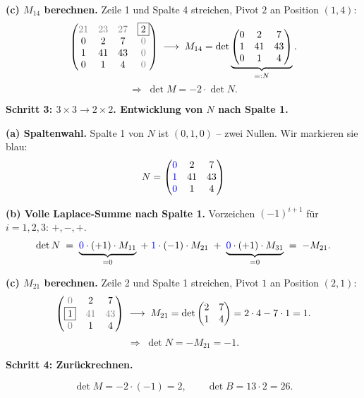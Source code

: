\documentclass[a4paper,12pt]{article}
\begin{document}
\textbf{(c) $M_{14}$ berechnen.} Zeile 1 und Spalte 4 streichen, Pivot $\boxed{2}$ an Position $(1,4)$:
\[
\begin{pmatrix}
\color{gray}{21} & \color{gray}{23} & \color{gray}{27} & \boxed{2} \\
0 & 2 & 7 & \color{gray}{0} \\
1 & 41 & 43 & \color{gray}{0} \\
0 & 1 & 4 & \color{gray}{0}
\end{pmatrix}
\;\longrightarrow\;
M_{14} = \det \underbrace{\begin{pmatrix} 0 & 2 & 7 \\ 1 & 41 & 43 \\ 0 & 1 & 4 \end{pmatrix}}_{=: N}.
\]
\[
\Rightarrow\; \det M = -2 \cdot \det N.
\]

\textbf{Schritt 3: $3\times 3 \to 2\times 2$. Entwicklung von $N$ nach Spalte 1.}

\textbf{(a) Spaltenwahl.} Spalte 1 von $N$ ist $(0, 1, 0)$ -- zwei Nullen. Wir markieren sie blau:
\[
N = \begin{pmatrix}
\color{blue}{0} & 2 & 7 \\
\color{blue}{1} & 41 & 43 \\
\color{blue}{0} & 1 & 4
\end{pmatrix}
\]

\textbf{(b) Volle Laplace-Summe nach Spalte 1.} Vorzeichen $(-1)^{i+1}$ f\"ur $i = 1, 2, 3$: $+, -, +$.
\[
\det N
\;=\; \underbrace{\textcolor{blue}{0} \cdot (+1) \cdot M_{11}}_{= 0}
\;+\; \textcolor{blue}{1} \cdot (-1) \cdot M_{21}
\;+\; \underbrace{\textcolor{blue}{0} \cdot (+1) \cdot M_{31}}_{= 0}
\;=\; -M_{21}.
\]

\textbf{(c) $M_{21}$ berechnen.} Zeile 2 und Spalte 1 streichen, Pivot $\boxed{1}$ an Position $(2,1)$:
\[
\begin{pmatrix}
\color{gray}{0} & 2 & 7 \\
\boxed{1} & \color{gray}{41} & \color{gray}{43} \\
\color{gray}{0} & 1 & 4
\end{pmatrix}
\;\longrightarrow\;
M_{21} = \det \begin{pmatrix} 2 & 7 \\ 1 & 4 \end{pmatrix} = 2 \cdot 4 - 7 \cdot 1 = 1.
\]
\[
\Rightarrow\; \det N = -M_{21} = -1.
\]

\textbf{Schritt 4: Zur\"uckrechnen.}

\[
\det M = -2 \cdot (-1) = 2, \qquad \det B = 13 \cdot 2 = 26.
\]
\end{document}
